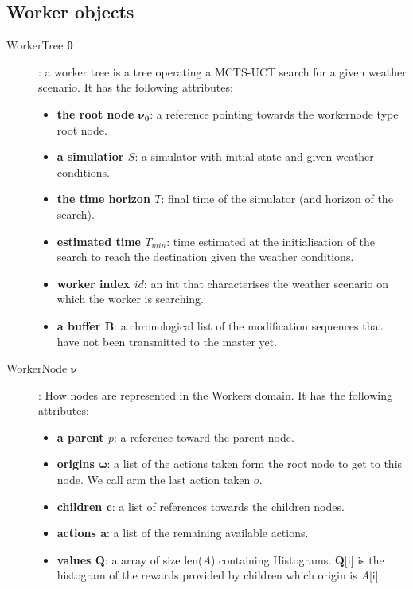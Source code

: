 \documentclass[letterpaper]{article} %
\newcommand{\bsy}[1]{\boldsymbol{#1}}
\begin{document}
\subsection*{Worker objects}
\begin{description}
\item[WorkerTree $\bsy{\theta}$]: a worker tree is a tree operating a MCTS-UCT search for a given weather scenario. It has the following attributes: 
\begin{itemize}
    \item \textbf{the root node $\bsy{\nu_0}$}: a reference pointing towards the workernode type root node. 
    \item \textbf{a simulatior $S$}: a simulator with initial state and given weather conditions. 
    \item \textbf{the time horizon $T$}: final time of the simulator (and horizon of the search).
    \item \textbf{estimated time $T_{min}$}: time estimated at the initialisation of the search to reach the destination given the weather conditions. 
    \item \textbf{worker index $id$}: an int that characterises the weather scenario on which the worker is searching. 
    \item \textbf{a buffer $\bsy{B}$}: a chronological list of the modification sequences that have not been transmitted to the master yet. 
\end{itemize}

\item[WorkerNode $\bsy{\nu}$]: How nodes are represented in the Workers domain. It has the following attributes:  
\begin{itemize}
    \item \textbf{a parent $p$}: a reference toward the parent node.
    \item \textbf{origins $\bsy{\omega}$}: a list of the actions taken form the root node to get to this node. We call arm the last action taken $o$. 
    \item \textbf{children $\bsy{c}$}: a list of references towards the children nodes.
    \item \textbf{actions $\bsy{a}$}: a list of the remaining available actions.
    \item \textbf{values $\bsy{Q}$}: a array of size len($A$) containing Histograms. $\bsy{Q}$[i] is the histogram of the rewards provided by children which origin is $A$[i]. 
\end{itemize}
\end{description}
\end{document}

